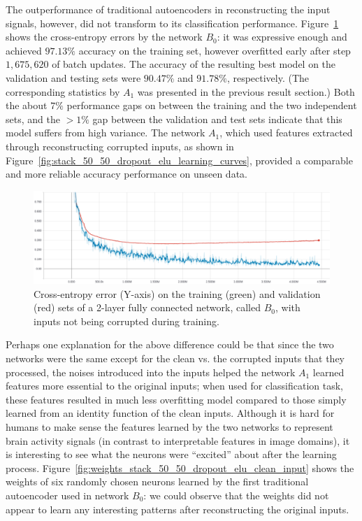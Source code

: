 \documentclass[12pt]{article}
\begin{document}
The outperformance of traditional autoencoders in reconstructing the input signals, however, did not transform to its classification performance. Figure~\ref{fig:stack_50_50_dropout_elu_clean_input} shows the cross-entropy errors by the network $B_0$: it was expressive enough and achieved $97.13\%$ accuracy on the training set, however overfitted early after step $1,675,620$ of batch updates. The accuracy of the resulting best model on the validation and testing sets were $90.47\%$ and $91.78\%$, respectively. (The corresponding statistics by $A_1$ was presented in the previous result section.) Both the about $7\%$ performance gaps on between the training and the two independent sets, and the $>1\%$ gap between the validation and test sets indicate that this model suffers from high variance. The network $A_1$, which used features extracted through reconstructing corrupted inputs, as shown in Figure~\ref{fig:stack_50_50_dropout_elu_learning_curves}, provided a comparable and more reliable accuracy performance on unseen data.

\begin{figure}
  \includegraphics[width=\linewidth]{figures/stack_50_50_dropout_elu_clean_input/stack_50_50_dropout_elu_clean_input.eps}
  \caption{Cross-entropy error (Y-axis) on the training (green) and validation (red) sets of a 2-layer fully connected network, called $B_0$, with inputs not being corrupted during training.}
  \label{fig:stack_50_50_dropout_elu_clean_input}
\end{figure}

Perhaps one explanation for the above difference could be that since the two networks were the same except for the clean vs. the corrupted inputs that they processed, the noises introduced into the inputs helped the network $A_1$ learned features more essential to the original inputs; when used for classification task, these features resulted in much less overfitting model compared to those simply learned from an identity function of the clean inputs. Although it is hard for humans to make sense the features learned by the two networks to represent brain activity signals (in contrast to interpretable features in image domains), it is interesting to see what the neurons were ``excited'' about after the learning process. Figure~\ref{fig:weights_stack_50_50_dropout_elu_clean_input} shows the weights of six randomly chosen neurons learned by the first traditional autoencoder used in network $B_0$: we could observe that the weights did not appear to learn any interesting patterns after reconstructing the original inputs.
\end{document}
